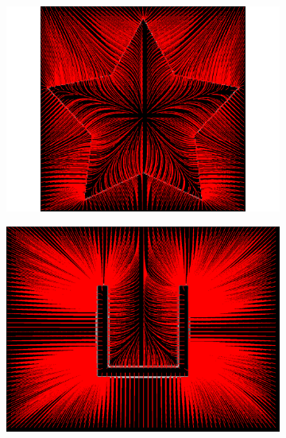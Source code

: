 \begin{figure}[H]
\centering
\begin{subfigure}[c]{0.4\linewidth}
\centering
\includegraphics[width=\textwidth]{Chapters/Images/Conc/gvfsstream}
\caption{}
\end{subfigure}
\begin{subfigure}[c]{0.4\linewidth}
\centering
\includegraphics[width=\textwidth]{Chapters/Images/Conc/gvfsqstream}
\caption{}
\end{subfigure}
\\
\begin{subfigure}[c]{0.4\linewidth}
\centering

\end{subfigure}
\end{figure}
